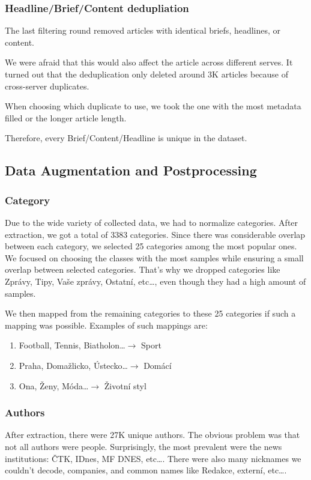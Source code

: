 \subsubsection{Headline/Brief/Content dedupliation}
The last filtering round removed articles with identical briefs, headlines, or content.

We were afraid that this would also affect the article across different serves.
It turned out that the deduplication only deleted around 3K articles
because of cross-server duplicates.

When choosing which duplicate to use, we took the one with the most metadata filled
or the longer article length.

Therefore, every Brief/Content/Headline is unique in the dataset.

\subsection{Data Augmentation and Postprocessing}

\subsubsection{Category}
\label{sec:category}
Due to the wide variety of collected data, we had to normalize categories.
After extraction, we got a total of 3383 categories.
Since there was considerable overlap between each category,
we selected 25 categories among the most popular ones.
We focused on choosing the classes with the most samples
while ensuring a small overlap between selected categories.
That's why we dropped categories like Zprávy, Tipy, Vaše zprávy, Ostatní, etc\dots,
even though they had a high amount of samples.


We then mapped from the remaining categories to these 25 categories if such a mapping was possible.
Examples of such mappings are:
\begin{enumerate}
    \item Football, Tennis, Biatholon\dots $\rightarrow$ Sport
    \item Praha, Domažlicko, Ústecko\dots $\rightarrow$ Domácí
    \item Ona, Ženy, Móda\dots $\rightarrow$ Životní styl
\end{enumerate}


\subsubsection{Authors}
\label{sec:authors}
After extraction, there were 27K unique authors.
The obvious problem was that not all authors were people.
Surprisingly, the most prevalent were the news institutions: ČTK, IDnes, MF DNES, etc\dots.
There were also many nicknames we couldn't decode, companies,
and common names like Redakce, externí, etc\dots.

